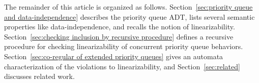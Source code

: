 The remainder of this article is organized as follows.
Section~\ref{sec:priority queue and data-independence} describes the priority queue ADT, lists several semantic properties like data-independence, and recalls the notion of linearizability.
Section~\ref{sec:checking inclusion by recursive procedure} defines a recursive procedure for checking linearizability of concurrent priority queue behaviors.
Section~\ref{sec:co-regular of extended priority queues} gives an automata characterization of the violations to linearizability, and
Section~\ref{sec:related} discusses related work. %










